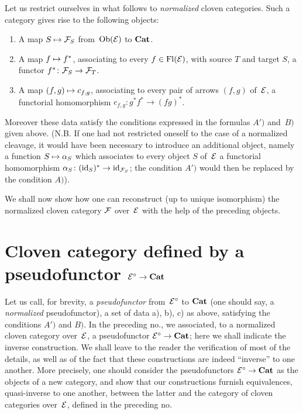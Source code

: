 Let us restrict ourselves in what follows to \emph{normalized}
cloven categories. Such a category gives rise to the
following objects:
\begin{enumerate}
\item[a)] A map $S\mto \cal{F}_S$ from~$\Ob(\cal{E})$ to
$\Cat$.
\item[b)] A map $f\mto f^*$, associating to every
$f\in\Fl(\cal{E})$, with source $T$ and target $S$,
a functor $f^*\colon \cal{F}_S\to\cal{F}_T$.
\item[c)] A map $(f,g)\mto c_{f,g}$, associating to every
pair of arrows $(f,g)$ of~$\cal{E}$, a functorial
homomorphism $c_{f,g}\colon g^*f^*\to (fg)^*$.
\end{enumerate}

Moreover these data satisfy the conditions expressed in
the formulas $A')$ and~$B)$ given above. (N.B. If one had not
restricted oneself to the case of a normalized cleavage, it would have
been necessary to introduce an additional object, namely a function
$S\mto \alpha_S$ which associates to every object $S$ of~$\cal{E}$ a
functorial homomorphism $\alpha_S\colon (\id_S)^*\to
\id_{\cal{F}_S}$; the condition $A')$ would then be replaced by the
condition $A)$).

We shall now show how one can reconstruct (up to
unique isomorphism) the normalized cloven
category $\cal{F}$ over~$\cal{E}$ with the help of the preceding
objects.

\section[Cloven category defined by a pseudofunctor]{Cloven category defined by a pseudofunctor
$\cal{E}^\circ\to\Cat$}
\label{VI.8}

Let us call, for brevity, a \emph{pseudofunctor} from~$\cal{E}^\circ$
to $\Cat$ (one should say, a \emph{normalized} pseudofunctor),
a set of data a), b), c) as above, satisfying the
conditions $A')$ and $B)$. In the preceding no., we
associated, to a normalized cloven category
over~$\cal{E}$, a pseudofunctor $\cal{E}^\circ\to\Cat$; here we
shall indicate the inverse construction. We shall leave to the reader the
verification of most of the details, as well as of the fact that
these constructions are indeed ``inverse'' to one another. More
precisely, one should consider the
pseudofunctors $\cal{E}^\circ\to\Cat$ as the objects of a
new category, and show that our constructions
furnish equivalences, quasi-inverse to one another,
between the latter and the category of
cloven categories over~$\cal{E}$, defined in the preceding
no.

